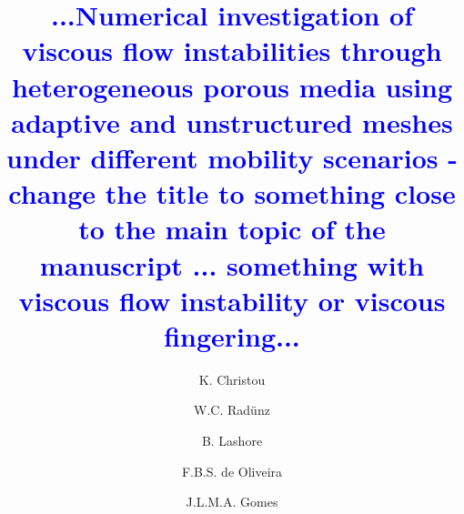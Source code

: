 \documentclass[preprint,authoryear,12pt]{elsarticle}
\newcommand{\blue}{\textcolor{blue}}
\begin{document}
\begin{frontmatter}



\title{ \blue{...Numerical investigation of viscous flow instabilities through heterogeneous porous media using adaptive and unstructured meshes under different mobility scenarios - change the title to something close to the main topic of the manuscript ... something with viscous flow instability or viscous fingering...}}

\author[UoA]{K. Christou} \author[UoA,UFRGS]{W.C. Rad\"unz}  \author[UoA]{B. Lashore} \author[UESC]{F.B.S. de Oliveira}
\author[UoA]{J.L.M.A. Gomes}

\address[UoA]{Environmental and Industrial Fluid Mechanics Group, School of Engineering, University of Aberdeen, UK}
\address[UFRGS]{Engineering School, Federal University of Rio Grande do Sul, Brazil}
\address[UESC]{Department of Exact and Technological Sciences, State University of Santa Cruz, Bahia, Brazil}


\end{frontmatter}
\end{document}
